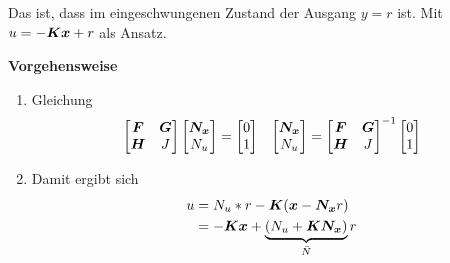 \begin{tcolorbox}[colback=white!10!white,colframe=green!30!black,title=Referenzsystem] 
Das ist, dass im eingeschwungenen Zustand der Ausgang $y = r$ ist. Mit $u = -\boldsymbol{Kx}+r$ als Ansatz.

\tcblower
\textbf{Vorgehensweise}
\begin{enumerate}
    \item Gleichung \begin{align*}
        \begin{bmatrix}
        \boldsymbol{F} &\boldsymbol{G}\\ \boldsymbol{H} & J
        \end{bmatrix}\begin{bmatrix}
        \boldsymbol{N_x}\\N_u
        \end{bmatrix} = \begin{bmatrix}
            0\\1
        \end{bmatrix} && \begin{bmatrix}
        \boldsymbol{N_x}\\N_u
        \end{bmatrix} = 
        \begin{bmatrix}
        \boldsymbol{F} &\boldsymbol{G}\\ \boldsymbol{H} & J
        \end{bmatrix}^{-1} \begin{bmatrix}
        0\\1
        \end{bmatrix}
    \end{align*}
    \item Damit ergibt sich \begin{align*}
    u &= N_u  *r-\boldsymbol{K}(\boldsymbol{x}-\boldsymbol{N_x}r)\\
    &= -\boldsymbol{Kx}+\underbrace{(N_u+\boldsymbol{KN_x})}_{\bar{N}}r
    \end{align*}
\end{enumerate}



    
\end{tcolorbox}
\columnbreak
